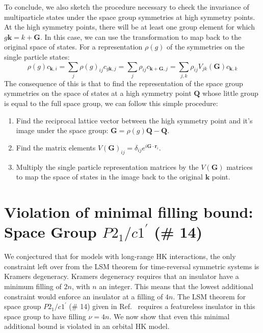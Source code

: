 \documentclass[prb,aps,amssymb,twocolumn,notitlepage]{revtex4-2}
\begin{document}
To conclude, we also sketch the procedure necessary to check the invariance of multiparticle states under the space group symmetries at high symmetry points. 
At the high symmetry points, there will be at least one group element for which $g\mathbf{k}=k+\mathbf{G}$. 
In this case, we can use the transformation to map back to the original space of states.
For a representation $\rho(g)$ of the symmetries on the single particle states:
\begin{equation}
    \rho(g)c_{\mathbf{k},i}=\sum_{j}\rho(g)_{ij}c_{g\mathbf{k},j}=\sum_{j}\rho_{ij}c_{\mathbf{k}+\mathbf{G},j}=\sum_{j,k}\rho_{ij}V_{jk}(\mathbf{G})c_{\mathbf{k},k}
\end{equation}
The consequence of this is that to find the representation of the space group symmetries on the space of states at a high symmetry point $\mathbf{Q}$ whose little group is equal to the full space group, we can follow this simple procedure:
\begin{enumerate}
    \item Find the reciprocal lattice vector between the high symmetry point and it's image under the space group: $\mathbf{G}=\rho(g)\mathbf{Q}-\mathbf{Q}$.
    \item Find the matrix elements $V(\mathbf{G})_{ij}=\delta_{ij}e^{i\mathbf{G}\cdot\mathbf{r}_{i}}$.
    \item Multiply the single particle representation matrices by the $V(\mathbf{G})$ matrices to map the space of states in the image back to the original $\mathbf{k}$ point.
\end{enumerate}


\section{Violation of minimal filling bound: Space Group $P2_1/c1^\prime$ (\# 14)}
\label{sec:SG14}
We conjectured that for models with long-range HK interactions, the only constraint left over from the LSM theorem for time-reversal symmetric systems is Kramers degeneracy. 
Kramers degeneracy requires that an insulator have a minimum filling of $2n$, with $n$ an integer. 
This means that the lowest additional constraint would enforce an insulator at a filling of $4n$. 
The LSM theorem for space group $P2_1/c1^\prime$ (\# 14) given in Ref.~\cite{watanabe2015filling} requires a featureless insulator in this space group to have filling $\nu=4n$. 
We now show that even this minimal additional bound is violated in an orbital HK model.
\end{document}
